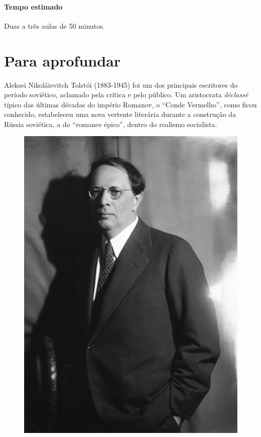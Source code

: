 \documentclass{article}
\begin{document}
\paragraph{Tempo estimado} Duas a três aulas de 50 minutos.

\section{Para aprofundar}

Aleksei Nikoláievitch Tolstói
(1883-1945) foi um dos principais escritores do período soviético,
aclamado pela crítica e pelo público. Um aristocrata \emph{déclassé}
típico das últimas décadas do império Romanov, o ``Conde Vermelho'',
como ficou conhecido, estabeleceu uma nova vertente literária durante a
construção da Rússia soviética, a do ``romance épico'', dentro do
realismo socialista.

\begin{figure}[ht!]
\includegraphics[width=\textwidth]{./images/PNLD0049-03.png}
\end{figure}
\end{document}
